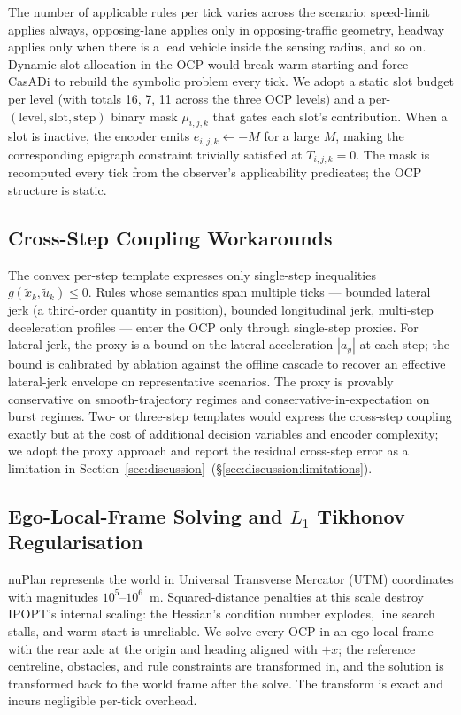 The number of applicable rules per tick varies across the scenario: speed-limit applies always, opposing-lane applies only in opposing-traffic geometry, headway applies only when there is a lead vehicle inside the sensing radius, and so on. Dynamic slot allocation in the OCP would break warm-starting and force CasADi to rebuild the symbolic problem every tick. We adopt a static slot budget per level (with totals 16, 7, 11 across the three OCP levels) and a per-$(\mathrm{level}, \mathrm{slot}, \mathrm{step})$ binary mask $\mu_{i,j,k}$ that gates each slot's contribution. When a slot is inactive, the encoder emits $e_{i,j,k} \leftarrow -M$ for a large $M$, making the corresponding epigraph constraint trivially satisfied at $T_{i,j,k} = 0$. The mask is recomputed every tick from the observer's applicability predicates; the OCP structure is static.

\subsection{Cross-Step Coupling Workarounds}
\label{sec:deployment:cross-step}

The convex per-step template expresses only single-step inequalities $g(\tilde{x}_k, \tilde{u}_k) \leq 0$. Rules whose semantics span multiple ticks --- bounded lateral jerk (a third-order quantity in position), bounded longitudinal jerk, multi-step deceleration profiles --- enter the OCP only through single-step proxies. For lateral jerk, the proxy is a bound on the lateral acceleration $|a_y|$ at each step; the bound is calibrated by ablation against the offline cascade to recover an effective lateral-jerk envelope on representative scenarios. The proxy is provably conservative on smooth-trajectory regimes and conservative-in-expectation on burst regimes. Two- or three-step templates would express the cross-step coupling exactly but at the cost of additional decision variables and encoder complexity; we adopt the proxy approach and report the residual cross-step error as a limitation in Section~\ref{sec:discussion}~(\S\ref{sec:discussion:limitations}).

\subsection{Ego-Local-Frame Solving and $L_1$ Tikhonov Regularisation}
\label{sec:deployment:frame}

nuPlan represents the world in Universal Transverse Mercator (UTM) coordinates with magnitudes $10^{5}$--$10^{6}$~m. Squared-distance penalties at this scale destroy IPOPT's internal scaling: the Hessian's condition number explodes, line search stalls, and warm-start is unreliable. We solve every OCP in an ego-local frame with the rear axle at the origin and heading aligned with $+x$; the reference centreline, obstacles, and rule constraints are transformed in, and the solution is transformed back to the world frame after the solve. The transform is exact and incurs negligible per-tick overhead.

